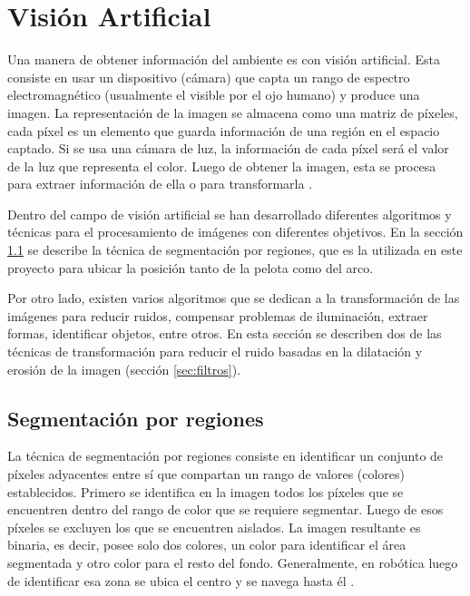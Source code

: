 \section{Visión Artificial} \label{sect:Vision_Artificial}

Una manera de obtener información del ambiente es con visión artificial. Esta consiste en usar un dispositivo (cámara) que capta un rango de espectro electromagnético (usualmente el visible por el ojo humano) y produce una imagen. La representación de la imagen se almacena como una matriz de píxeles, cada píxel es un elemento que guarda información de una región en el espacio captado. Si se usa una cámara de luz, la información de cada píxel será el valor de la luz que representa el color. Luego de obtener la imagen, esta se procesa para extraer información de ella o para transformarla \cite{AiRobotics}.

Dentro del campo de visión artificial se han desarrollado diferentes algoritmos y t\'ecnicas para el procesamiento de imágenes con diferentes objetivos. En la sección \ref{sec:Segmentacion} se describe la t\'ecnica de segmentaci\'on por regiones, que es la utilizada en este proyecto para ubicar la posición tanto de la pelota como del arco. 

Por otro lado, existen varios algoritmos que se dedican a la transformación de las imágenes para reducir ruidos, compensar problemas de iluminación, extraer formas, identificar objetos, entre otros. En esta sección se describen dos de las técnicas de transformación para reducir el ruido basadas en la dilatación y erosión de la imagen (secci\'on \ref{sec:filtros}). 
 
\subsection{Segmentaci\'on por regiones}\label{sec:Segmentacion}

La técnica de segmentación por regiones consiste en identificar un conjunto de píxeles adyacentes entre sí que compartan un rango de valores (colores) establecidos. Primero se identifica en la imagen todos los píxeles que se encuentren dentro del rango de color que se requiere segmentar. Luego de esos píxeles se excluyen los que se encuentren aislados. La imagen resultante es binaria, es decir, posee solo dos colores, un color para identificar el área segmentada y otro color para el resto del fondo.
Generalmente, en robótica luego de identificar esa zona se ubica el centro y se navega hasta él \cite{AiRobotics}. 

